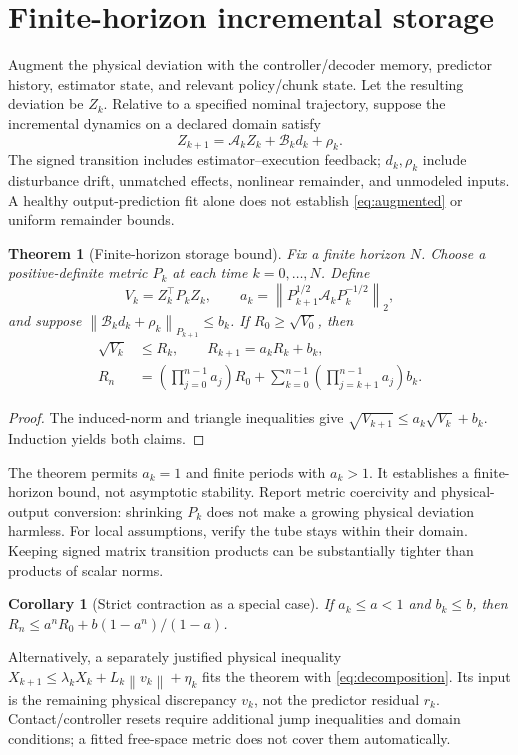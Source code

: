 \documentclass[11pt]{article}
\newtheorem{theorem}{Theorem}
\newtheorem{corollary}{Corollary}
\newcommand{\norm}[1]{\left\lVert#1\right\rVert}
\begin{document}
\section{Finite-horizon incremental storage}
Augment the physical deviation with the controller/decoder memory,
predictor history, estimator state, and relevant policy/chunk state.
Let the resulting deviation be $Z_k$. Relative to a specified nominal
trajectory, suppose the incremental dynamics on a declared domain satisfy
\begin{equation}
 Z_{k+1}=\mathcal A_kZ_k+\mathcal B_kd_k+\rho_k.
 \label{eq:augmented}
\end{equation}
The signed transition includes estimator--execution feedback; $d_k,\rho_k$
include disturbance drift, unmatched effects, nonlinear remainder, and
unmodeled inputs. A healthy output-prediction fit alone does not establish
\eqref{eq:augmented} or uniform remainder bounds.

\begin{theorem}[Finite-horizon storage bound]
Fix a finite horizon $N$. Choose a positive-definite metric $P_k$ at each
time $k=0,\ldots,N$. Define
\[
 V_k=Z_k^\top P_kZ_k,\qquad
 a_k=\norm{P_{k+1}^{1/2}\mathcal A_kP_k^{-1/2}}_2,
\]
and suppose
$\norm{\mathcal B_kd_k+\rho_k}_{P_{k+1}}\le b_k$.
If $R_0\ge\sqrt{V_0}$, then
\begin{align}
 \sqrt{V_k}&\le R_k,\qquad R_{k+1}=a_kR_k+b_k,\\
 R_n&=\left(\prod_{j=0}^{n-1}a_j\right)R_0+
 \sum_{k=0}^{n-1}\left(\prod_{j=k+1}^{n-1}a_j\right)b_k.
 \label{eq:tube}
\end{align}
\end{theorem}
\begin{proof}
The induced-norm and triangle inequalities give
$\sqrt{V_{k+1}}\le a_k\sqrt{V_k}+b_k$.
Induction yields both claims.
\end{proof}
The theorem permits $a_k=1$ and finite periods with $a_k>1$.
It establishes a finite-horizon bound, not asymptotic stability.
Report metric coercivity and physical-output conversion: shrinking $P_k$
does not make a growing physical deviation harmless.
For local assumptions, verify the tube stays within their domain.
Keeping signed matrix transition products can be substantially tighter than
products of scalar norms.

\begin{corollary}[Strict contraction as a special case]
If $a_k\le a<1$ and $b_k\le b$, then
$R_n\le a^nR_0+b(1-a^n)/(1-a)$.
\end{corollary}
Alternatively, a separately justified physical inequality
$X_{k+1}\le\lambda_kX_k+L_k\norm{v_k}+\eta_k$
fits the theorem with \eqref{eq:decomposition}. Its input is the remaining
physical discrepancy $v_k$, not the predictor residual $r_k$.
Contact/controller resets require additional jump inequalities and domain
conditions; a fitted free-space metric does not cover them automatically.
\end{document}
